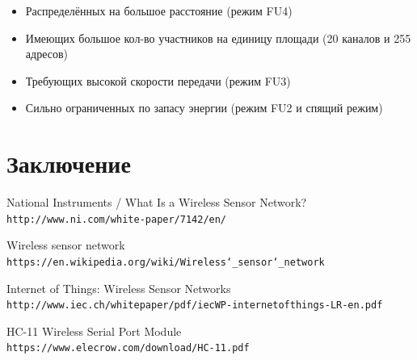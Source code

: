 \documentclass[bibliography=totocnumbered]{scrartcl}
\begin{document}
\begin{itemize}
\item Распределённых на большое расстояние (режим FU4)
\item Имеющих большое кол-во участников на единицу площади (20 каналов и 255 адресов)
\item Требующих высокой скорости передачи (режим FU3)

\item Сильно ограниченных по запасу энергии (режим FU2 и спящий режим)

\end{itemize}


\section{Заключение}
\newpage

\begin{thebibliography}{9}
National Instruments / What Is a Wireless Sensor Network?
\\\texttt{http://www.ni.com/white-paper/7142/en/}
 

Wireless sensor network
\\\texttt{https://en.wikipedia.org/wiki/Wireless\char`_sensor\char`_network}

Internet of Things: Wireless Sensor Networks
\\\texttt{http://www.iec.ch/whitepaper/pdf/iecWP-internetofthings-LR-en.pdf}

HC-11 Wireless Serial Port Module
\\\texttt{https://www.elecrow.com/download/HC-11.pdf}

\end{thebibliography}
\end{document}
